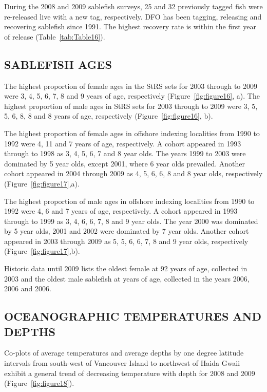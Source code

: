 \documentclass[12pt]{article}\usepackage[]{graphicx}\usepackage[]{color}
\begin{document}
During the 2008 and 2009 sablefish surveys, 25 and 32 previously tagged fish were re-released live with a new tag, respectively. DFO has been tagging, releasing and recovering sablefish since 1991. The highest recovery rate is within the first year of release (Table~\ref{tab:Table16}).

\hypertarget{sablefish-ages}{%
\subsection{SABLEFISH AGES}\label{sablefish-ages}}

The highest proportion of female ages in the StRS sets for 2003 through to 2009 were 3, 4, 5, 6, 7, 8 and 9 years of age, respectively (Figure~\ref{fig:figure16}, a). The highest proportion of male ages in StRS sets for 2003 through to 2009 were 3, 5, 5, 6, 8, 8 and 8 years of age, respectively (Figure~\ref{fig:figure16}, b).

The highest proportion of female ages in offshore indexing localities from 1990 to 1992 were 4, 11 and 7 years of age, respectively. A cohort appeared in 1993 through to 1998 as 3, 4, 5, 6, 7 and 8 year olds. The years 1999 to 2003 were dominated by 5 year olds, except 2001, where 6 year olds prevailed. Another cohort appeared in 2004 through 2009 as 4, 5, 6, 6, 8 and 8 year olds, respectively (Figure~\ref{fig:figure17},a).

The highest proportion of male ages in offshore indexing localities from 1990 to 1992 were 4, 6 and 7 years of age, respectively. A cohort appeared in 1993 through to 1999 as 3, 4, 6, 6, 7, 8 and 9 year olds. The year 2000 was dominated by 5 year olds, 2001 and 2002 were dominated by 7 year olds. Another cohort appeared in 2003 through 2009 as 5, 5, 6, 6, 7, 8 and 9 year olds, respectively (Figure~\ref{fig:figure17},b).

Historic data until 2009 lists the oldest female at 92 years of age, collected in 2003 and the oldest male sablefish at years of age, collected in the years 2006, 2006 and 2006.

\hypertarget{oceanographic-temperatures-and-depths}{%
\subsection{OCEANOGRAPHIC TEMPERATURES AND DEPTHS}\label{oceanographic-temperatures-and-depths}}

Co-plots of average temperatures and average depths by one degree latitude intervals from south-west of Vancouver Island to northwest of Haida Gwaii exhibit a general trend of decreasing temperature with depth for 2008 and 2009 (Figure~\ref{fig:figure18}).
\end{document}
